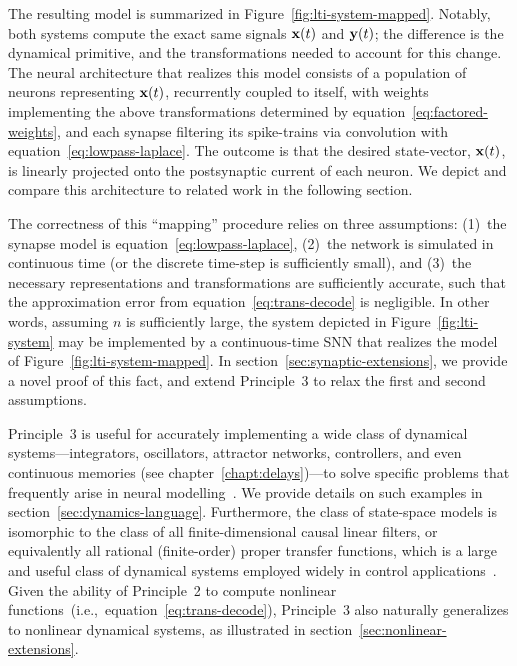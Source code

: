 The resulting model is summarized in Figure~\ref{fig:lti-system-mapped}.
Notably, both systems compute the exact same signals $\mathbf{x}(t)$ and $\mathbf{y}(t)$; the difference is the dynamical primitive, and the transformations needed to account for this change.
The neural architecture that realizes this model consists of a population of neurons representing $\mathbf{x}(t)$, recurrently coupled to itself, with weights implementing the above transformations determined by equation~\ref{eq:factored-weights}, and each synapse filtering its spike-trains via convolution with equation~\ref{eq:lowpass-laplace}.
The outcome is that the desired state-vector, $\mathbf{x}(t)$, is linearly projected onto the postsynaptic current of each neuron.
We depict and compare this architecture to related work in the following section.

The correctness of this ``mapping'' procedure relies on three assumptions: (1)~the synapse model is equation~\ref{eq:lowpass-laplace}, (2)~the network is simulated in continuous time (or the discrete time-step is sufficiently small), and (3)~the necessary representations and transformations are sufficiently accurate, such that the approximation error from equation~\ref{eq:trans-decode} is negligible.
In other words, assuming $n$ is sufficiently large, the system depicted in Figure~\ref{fig:lti-system} may be implemented by a continuous-time SNN that realizes the model of Figure~\ref{fig:lti-system-mapped}.
In section~\ref{sec:synaptic-extensions}, we provide a novel proof of this fact, and extend Principle~3 to relax the first and second assumptions.

Principle~3 is useful for accurately implementing a wide class of dynamical systems---integrators, oscillators, attractor networks, controllers, and even continuous memories (see chapter~\ref{chapt:delays})---to solve specific problems that frequently arise in neural modelling~\citep[e.g.,][]{eliasmith2000b, singh2004, eliasmith2005b, singh2006}.
We provide details on such examples in section~\ref{sec:dynamics-language}.
Furthermore, the class of state-space models is isomorphic to the class of all finite-dimensional causal linear filters, or equivalently all rational (finite-order) proper transfer functions, which is a large and useful class of dynamical systems employed widely in control applications~\citep{brogan1982modern}.
Given the ability of Principle~2 to compute nonlinear functions~(i.e.,~equation~\ref{eq:trans-decode}), Principle~3 also naturally generalizes to nonlinear dynamical systems, as illustrated in section~\ref{sec:nonlinear-extensions}.

